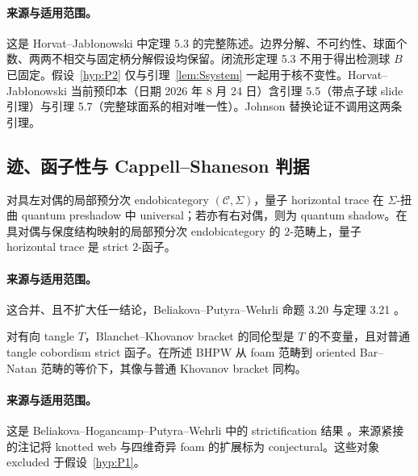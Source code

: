 \paragraph{来源与适用范围。}
这是 Horvat--Jab\l onowski \cite[Theorem~5.3]{HorvatJablonowski2025} 中定理 5.3 的完整陈述。边界分解、不可约性、球面个数、两两不相交与固定柄分解假设均保留。闭流形定理 5.3 不用于得出检测球 $B$ 已固定。假设~\ref{hyp:P2} 仅与引理~\ref{lem:Ssystem} 一起用于核不变性。Horvat--Jab\l onowski 当前预印本（日期 2026 年 8 月 24 日）含引理 5.5（带点子球 slide 引理）与引理 5.7（完整球面系的相对唯一性）。Johnson 替换论证不调用这两条引理。

\subsection{迹、函子性与 Cappell--Shaneson 判据}

\begin{externalresult}\label{prop:bpw-trace}
对具左对偶的局部预分次 endobicategory $(\mathcal C,\Sigma)$，量子 horizontal trace 在 $\Sigma$-扭曲 quantum preshadow 中 universal；若亦有右对偶，则为 quantum shadow。在具对偶与保度结构映射的局部预分次 endobicategory 的 $2$-范畴上，量子 horizontal trace 是 strict $2$-函子。
\end{externalresult}

\paragraph{来源与适用范围。}
这合并、且不扩大任一结论，Beliakova--Putyra--Wehrli 命题 3.20 与定理 3.21 \cite[Proposition~3.20 and Theorem~3.21]{BeliakovaPutyraWehrli2019}。

\begin{externalresult}[BHPW 定理 4.6]\label{prop:bhpw}
对有向 tangle $T$，Blanchet--Khovanov bracket 的同伦型是 $T$ 的不变量，且对普通 tangle cobordism strict 函子。在所述 BHPW 从 foam 范畴到 oriented Bar--Natan 范畴的等价下，其像与普通 Khovanov bracket 同构。
\end{externalresult}

\paragraph{来源与适用范围。}
这是 Beliakova--Hogancamp--Putyra--Wehrli 中的 strictification 结果 \cite[Theorem~4.6]{BeliakovaHogancampPutyraWehrli2023}。来源紧接的注记将 knotted web 与四维奇异 foam 的扩展标为 conjectural。这些对象 excluded 于假设~\ref{hyp:P1}。

